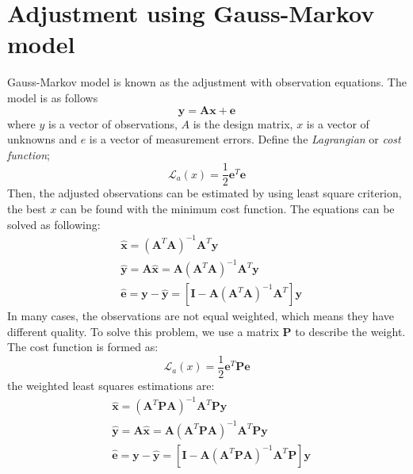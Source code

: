 \chapter{Adjustment using Gauss-Markov model}\label{sec:Gaussmarkov}
Gauss-Markov model is known as the adjustment with observation equations. The model is as follows
\begin{equation}
\bm{y} = \bm{A}\bm{x} + \bm{e}
\end{equation}
where $y$ is a vector of observations, $A$ is the design matrix, $x$ is a vector of unknowns and $e$ is a vector of measurement errors. Define the \textit{Lagrangian} or \textit{cost function};
\begin{equation}
\mathcal{L}_{a}(x) = \frac{1}{2} \bm{e}^T \bm{e}
\end{equation} 
Then, the adjusted observations can be estimated by using least square criterion, the best $x$ can be found with the minimum cost function. The equations can be solved as following:
\begin{align}
&\hat{\bm{x}} = (\bm{A}^T\bm{A})^{-1}\bm{A}^T\bm{y}\\
&\hat{\bm{y}} = \bm{A}\hat{\bm{x}} = \bm{A}(\bm{A}^T\bm{A})^{-1}\bm{A}^T\bm{y}\\
&\hat{\bm{e}} = \bm{y} - \hat{\bm{y}} = [\bm{I} - \bm{A}(\bm{A}^T\bm{A})^{-1}\bm{A}^T]\bm{y}
\end{align}
In many cases, the observations are not equal weighted, which means they have different quality. To solve this problem,  we use a matrix $\bm{P}$ to describe the weight. The cost function is formed as:
\begin{equation}
\mathcal{L}_{a}(x) = \frac{1}{2} \bm{e}^T \bm{P}\bm{e}
\end{equation}
the weighted least squares estimations are:
\begin{align}
&\hat{\bm{x}} = (\bm{A}^T \bm{P}\bm{A})^{-1}\bm{A}^T\bm{P}\bm{y}\\
&\hat{\bm{y}} = \bm{A}\hat{\bm{x}} = \bm{A}(\bm{A}^T\bm{P}\bm{A})^{-1}\bm{A}^T\bm{P}\bm{y}\\
&\hat{\bm{e}} = \bm{y} - \hat{\bm{y}} = [\bm{I} - \bm{A}(\bm{A}^T\bm{P}\bm{A})^{-1}\bm{A}^T\bm{P}]\bm{y}
\end{align}